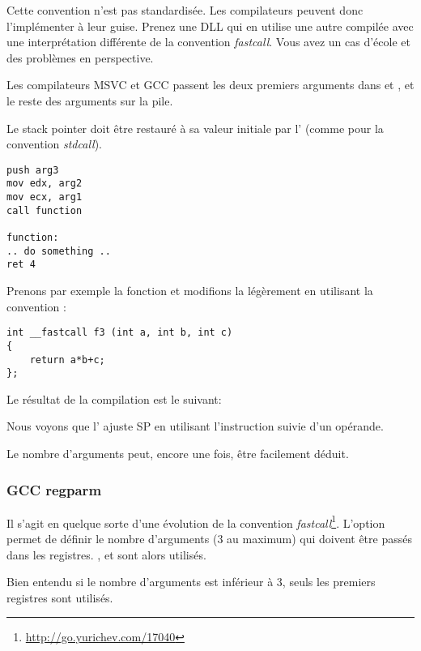 Cette convention n'est pas standardisée. Les compilateurs peuvent donc l'implémenter à leur guise.
Prenez une DLL qui en utilise une autre compilée avec une interprétation différente de la convention
\emph{fastcall}. Vous avez un cas d'école et des problèmes en perspective.

Les compilateurs MSVC et GCC passent les deux premiers arguments dans \ECX et \EDX, et le reste des
arguments sur la pile.

Le \gls{stack pointer} doit être restauré à sa valeur initiale par l'
(comme pour la convention \emph{stdcall}).

\begin{lstlisting}[caption=fastcall,style=customasmx86]
push arg3
mov edx, arg2
mov ecx, arg1
call function

function:
.. do something ..
ret 4
\end{lstlisting}

Prenons par exemple la fonction  et modifions la légèrement en utilisant la convention  :

\begin{lstlisting}[style=customc]
int __fastcall f3 (int a, int b, int c)
{
	return a*b+c;
};
\end{lstlisting}

Le résultat de la compilation est le suivant:



Nous voyons que l' ajuste \ac{SP} en utilisant l'instruction  suivie d'un opérande.

Le nombre d'arguments peut, encore une fois, être facilement déduit.

\subsubsection{GCC regparm}

\newcommand{\URLREGPARMM}{\url{http://go.yurichev.com/17040}}

Il s'agit en quelque sorte d'une évolution de la convention \emph{fastcall}\footnote{\URLREGPARMM}.
L'option  permet de définir le nombre d'arguments (3 au maximum) qui doivent être passés
dans les registres. \EAX, \EDX et \ECX sont alors utilisés.

Bien entendu si le nombre d'arguments est inférieur à 3, seuls les premiers registres sont utilisés.

